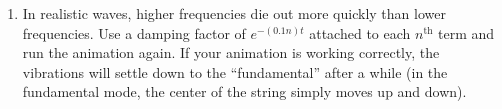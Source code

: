 \documentclass[10.5pt,twoside]{report}
\theoremstyle{definition}
\begin{document}
\begin{enumerate}
\begin{enumerate}
\item In realistic waves, higher frequencies die out more quickly than lower frequencies.  Use a damping factor of $e^{-(0.1 n) t}$ attached to each $n^{\mathrm{th}}$ term and run the animation again.  If your animation is working correctly, the vibrations will settle down to the ``fundamental'' after a while (in the fundamental mode, the center of the string simply moves up and down).

\end{enumerate}





\end{enumerate}

\pagebreak
\vspace*{\fill}
${}$\\
\vspace*{\fill}
\pagebreak
\vspace*{\fill}
${}$\\
\vspace*{\fill}
\pagebreak
\vspace*{\fill}
${}$\\
\vspace*{\fill}
\pagebreak
\vspace*{\fill}
${}$\\
\vspace*{\fill}
\pagebreak
\vspace*{\fill}
${}$\\
\vspace*{\fill}
\pagebreak
\vspace*{\fill}
${}$\\
\vspace*{\fill}
\end{document}
